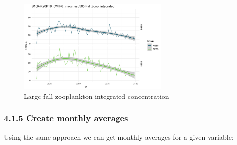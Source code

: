 \documentclass[
]{article}
\begin{document}
\begin{figure}
\centering
\includegraphics[width=0.65\textwidth,height=\textheight]{Figs/Fall_large_Zoop.jpg}
\caption{Large fall zooplankton integrated concentration}
\end{figure}

\hypertarget{create-monthly-averages}{%
\subsubsection{4.1.5 Create monthly
averages}\label{create-monthly-averages}}

Using the same approach we can get monthly averages for a given
variable:
\end{document}
